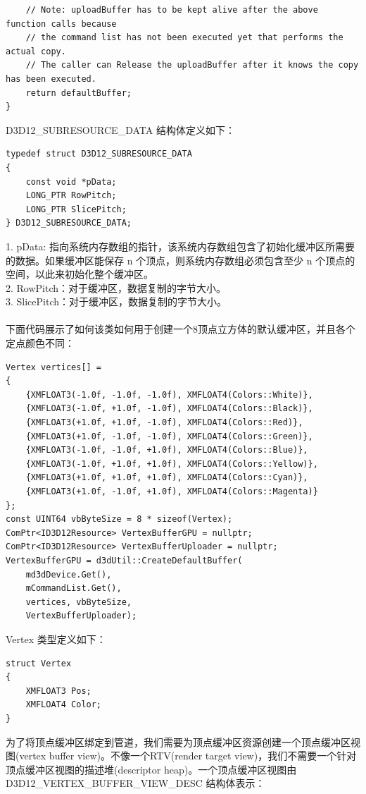 \documentclass[11pt,a4paper,oldfontcommands]{memoir}
\begin{document}
{\begin{flushleft}
\begin{lstlisting}
    // Note: uploadBuffer has to be kept alive after the above function calls because
    // the command list has not been executed yet that performs the actual copy.
    // The caller can Release the uploadBuffer after it knows the copy has been executed.
    return defaultBuffer;
}
\end{lstlisting}
D3D12\_SUBRESOURCE\_DATA 结构体定义如下：\\
\begin{lstlisting}
typedef struct D3D12_SUBRESOURCE_DATA
{
    const void *pData;
    LONG_PTR RowPitch;
    LONG_PTR SlicePitch;
} D3D12_SUBRESOURCE_DATA;
\end{lstlisting}
1. pData: 指向系统内存数组的指针，该系统内存数组包含了初始化缓冲区所需要的数据。如果缓冲区能保存 n 个顶点，则系统内存数组必须包含至少 n 个顶点的空间，以此来初始化整个缓冲区。\\
2. RowPitch：对于缓冲区，数据复制的字节大小。\\
3. SlicePitch：对于缓冲区，数据复制的字节大小。\\
~\\
下面代码展示了如何该类如何用于创建一个8顶点立方体的默认缓冲区，并且各个定点颜色不同：\\
\begin{lstlisting}
Vertex vertices[] = 
{
    {XMFLOAT3(-1.0f, -1.0f, -1.0f), XMFLOAT4(Colors::White)},
    {XMFLOAT3(-1.0f, +1.0f, -1.0f), XMFLOAT4(Colors::Black)},
    {XMFLOAT3(+1.0f, +1.0f, -1.0f), XMFLOAT4(Colors::Red)},
    {XMFLOAT3(+1.0f, -1.0f, -1.0f), XMFLOAT4(Colors::Green)},
    {XMFLOAT3(-1.0f, -1.0f, +1.0f), XMFLOAT4(Colors::Blue)},
    {XMFLOAT3(-1.0f, +1.0f, +1.0f), XMFLOAT4(Colors::Yellow)},
    {XMFLOAT3(+1.0f, +1.0f, +1.0f), XMFLOAT4(Colors::Cyan)},
    {XMFLOAT3(+1.0f, -1.0f, +1.0f), XMFLOAT4(Colors::Magenta)}
};
const UINT64 vbByteSize = 8 * sizeof(Vertex);
ComPtr<ID3D12Resource> VertexBufferGPU = nullptr;
ComPtr<ID3D12Resource> VertexBufferUploader = nullptr;
VertexBufferGPU = d3dUtil::CreateDefaultBuffer(
    md3dDevice.Get(),
    mCommandList.Get(),
    vertices, vbByteSize,
    VertexBufferUploader);
\end{lstlisting}
Vertex 类型定义如下：\\
\begin{lstlisting}
struct Vertex
{
    XMFLOAT3 Pos;
    XMFLOAT4 Color;
}
\end{lstlisting}
为了将顶点缓冲区绑定到管道，我们需要为顶点缓冲区资源创建一个顶点缓冲区视图(vertex buffer view)。不像一个RTV(render target view)，我们不需要一个针对顶点缓冲区视图的描述堆(descriptor heap)。一个顶点缓冲区视图由 D3D12\_VERTEX\_BUFFER\_VIEW\_DESC 结构体表示：\\

\end{flushleft}}
\end{document}
